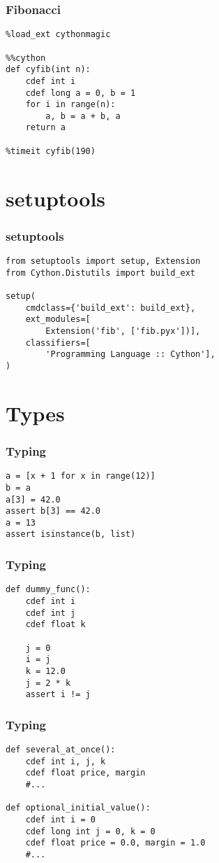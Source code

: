 \documentclass{beamer}
\begin{document}
\begin{frame}[fragile]
  \frametitle{Fibonacci}
    \begin{lstlisting}
%load_ext cythonmagic

%%cython
def cyfib(int n):
    cdef int i
    cdef long a = 0, b = 1
    for i in range(n):
        a, b = a + b, a
    return a

%timeit cyfib(190)
    \end{lstlisting}
\end{frame}

\section{setuptools}

\begin{frame}[fragile]
  \frametitle{setuptools}
    \begin{lstlisting}
from setuptools import setup, Extension
from Cython.Distutils import build_ext

setup(
    cmdclass={'build_ext': build_ext},
    ext_modules=[
        Extension('fib', ['fib.pyx'])],
    classifiers=[
        'Programming Language :: Cython'],
)
    \end{lstlisting}
\end{frame}

\section{Types}

\begin{frame}[fragile]
  \frametitle{Typing}
    \begin{lstlisting}
a = [x + 1 for x in range(12)]
b = a
a[3] = 42.0
assert b[3] == 42.0
a = 13
assert isinstance(b, list)
    \end{lstlisting}
\end{frame}

\begin{frame}[fragile]
  \frametitle{Typing}
    \begin{lstlisting}
def dummy_func():
    cdef int i
    cdef int j
    cdef float k

    j = 0
    i = j
    k = 12.0
    j = 2 * k
    assert i != j
    \end{lstlisting}
\end{frame}

\begin{frame}[fragile]
  \frametitle{Typing}
    \begin{lstlisting}
def several_at_once():
    cdef int i, j, k
    cdef float price, margin
    #...

def optional_initial_value():
    cdef int i = 0
    cdef long int j = 0, k = 0
    cdef float price = 0.0, margin = 1.0
    #...
    \end{lstlisting}
\end{frame}
\end{document}
